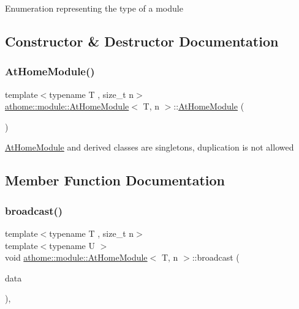 Enumeration representing the type of a module 

\subsection{Constructor \& Destructor Documentation}
\mbox{\label{classathome_1_1module_1_1_at_home_module_ad78045943a579874ec16e14cf976eada}} 
\subsubsection{\texorpdfstring{At\+Home\+Module()}{AtHomeModule()}}
{\footnotesize\ttfamily template$<$typename T , size\+\_\+t n$>$ \\
\mbox{\hyperlink{classathome_1_1module_1_1_at_home_module}{athome\+::module\+::\+At\+Home\+Module}}$<$ T, n $>$\+::\mbox{\hyperlink{classathome_1_1module_1_1_at_home_module}{At\+Home\+Module}} (\begin{DoxyParamCaption}\item[{const \mbox{\hyperlink{classathome_1_1module_1_1_at_home_module}{At\+Home\+Module}}$<$ T, n $>$ \&}]{ }\end{DoxyParamCaption})\hspace{0.3cm}{\ttfamily [delete]}}

\mbox{\hyperlink{classathome_1_1module_1_1_at_home_module}{At\+Home\+Module}} and derived classes are singletons, duplication is not allowed 

\subsection{Member Function Documentation}
\mbox{\label{classathome_1_1module_1_1_at_home_module_a22f6afbe9594849ecccae5b9f4dfe47d}} 
\subsubsection{\texorpdfstring{broadcast()}{broadcast()}}
{\footnotesize\ttfamily template$<$typename T , size\+\_\+t n$>$ \\
template$<$typename U $>$ \\
void \mbox{\hyperlink{classathome_1_1module_1_1_at_home_module}{athome\+::module\+::\+At\+Home\+Module}}$<$ T, n $>$\+::broadcast (\begin{DoxyParamCaption}\item[{const U \&}]{data }\end{DoxyParamCaption})\hspace{0.3cm}{\ttfamily [inline]}, {\ttfamily [protected]}}

